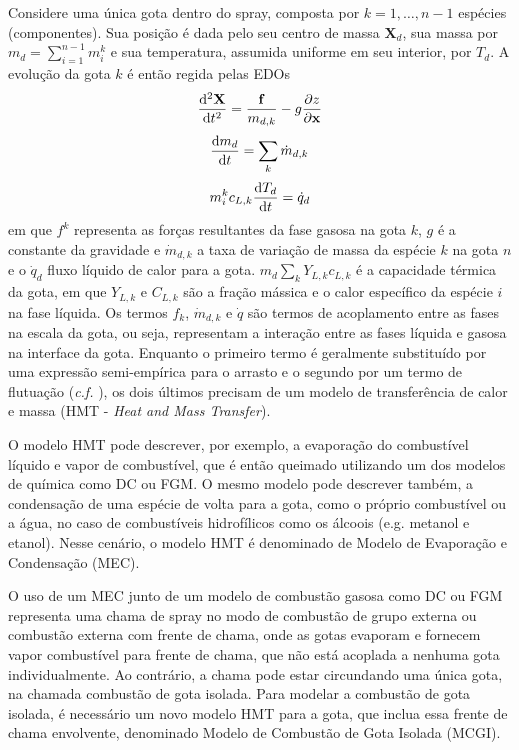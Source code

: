 Considere uma única gota dentro do spray, composta por $k=1,\ldots,n-1$ espécies (componentes).
Sua posição é dada pelo seu centro de massa $\mathbf X_d$, sua massa por $m_d = \sum_{i=1}^{n-1} m_{i}^k$ e sua temperatura, assumida uniforme em seu interior, por $T_d$.
A evolução da gota $k$ é então regida pelas EDOs \cite{JennyB2012}
\begin{equation}
    \frac{\mathrm{d}^2 \mathbf X}{\mathrm{d} t^2} =
    \frac{\mathbf f}{ m_{d,k}} -
    g \frac{\partial z}{\partial \mathbf x}
    \label{eq:Xd}
\end{equation}
\begin{equation}
    \frac{\mathrm{d} m_{d}}{\mathrm{d} t} = \sum_{k} \dot m_{d,k}
    \label{eq:md}
\end{equation}
\begin{equation}
    m_i^k c_{L,k} \frac{\mathrm{d} T_d}{\mathrm{d} t} = \dot q_d
    \label{eq:Td}
\end{equation}
em que $f^k$ representa as forças resultantes da fase gasosa na gota $k$, $g$ é a constante da gravidade e $\dot m_{d,k}$ a taxa de variação de massa da espécie $k$ na gota $n$ e o $\dot q_d$ fluxo líquido de calor para a gota.
$ m_d \sum_k Y_{L,k} c_{L,k}$ é a capacidade térmica da gota, em que 
$Y_{L,k}$ e $C_{L,k}$ são a fração mássica e o calor específico da  espécie $i$ na fase líquida.
Os termos $f_k$, $\dot m_{d,k}$ e $\dot q$ são termos de acoplamento entre as fases na escala da gota, ou seja, representam a interação entre as fases líquida e gasosa na interface da gota.
Enquanto o primeiro termo é geralmente substituído por uma expressão semi-empírica para o arrasto e o segundo por um termo de flutuação (\emph{c.f.} \cite[p. 16]{JennyB2012}), os dois últimos precisam de um modelo de transferência de calor e massa (HMT - \emph{Heat and Mass Transfer}).

O modelo HMT pode descrever, por exemplo, a evaporação do combustível líquido e vapor de combustível, que é então queimado utilizando um dos modelos de química como DC ou FGM.
O mesmo modelo pode descrever também, a condensação de uma espécie de volta para a gota, como o próprio combustível ou a água, no caso de combustíveis hidrofílicos como os álcoois (e.g. metanol e etanol).
Nesse cenário, o modelo HMT é denominado de Modelo de Evaporação e Condensação (MEC).

O uso de um MEC junto de um modelo de combustão gasosa como DC ou FGM representa uma chama de spray no modo de combustão de grupo externa ou combustão externa com frente de chama, onde as gotas evaporam e fornecem vapor combustível para frente de chama, que não está acoplada a nenhuma gota individualmente.
Ao contrário, a chama pode estar circundando uma única gota, na chamada combustão de gota isolada.
Para modelar a combustão de gota isolada, é necessário um novo modelo HMT para a gota, que inclua essa frente de chama envolvente, denominado Modelo de Combustão de Gota Isolada (MCGI). 


